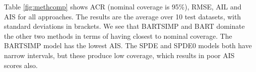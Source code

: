 \documentclass[preprint,12pt,authoryear]{elsarticle}
\begin{document}
{{
Table \ref{fig:methcomp} shows ACR (nominal coverage is 95\%), RMSE, AIL and AIS for all approaches. The results are the average over 10 test datasets, with standard deviations in brackets. We see that BARTSIMP and BART dominate the other two methods in terms of having closest to nominal coverage.  The BARTSIMP model has the lowest AIS. The SPDE and SPDE0 models both have narrow intervals, but these produce low coverage, which results in poor AIS scores also.} 
}
\end{document}
